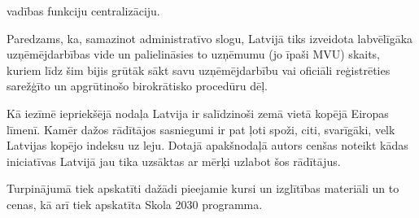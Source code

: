 vadības funkciju centralizāciju.
\par
Paredzams, ka, samazinot administratīvo slogu, Latvijā tiks izveidota labvēlīgāka
uzņēmējdarbības vide un palielināsies to uzņēmumu (jo īpaši MVU) skaits, kuriem līdz šim
bijis grūtāk sākt savu uzņēmējdarbību vai oficiāli reģistrēties sarežģīto un apgrūtinošo
birokrātisko procedūru dēļ.
\par
Kā iezīmē iepriekšējā nodaļa Latvija ir salīdzinoši zemā vietā kopējā Eiropas līmenī.
Kamēr dažos rādītājos sasniegumi ir pat ļoti spoži, citi, svarīgāki, velk Latvijas kopējo
indeksu uz leju. Dotajā apakšnodaļā autors cenšas noteikt kādas iniciatīvas Latvijā jau
tika uzsāktas ar mērķi uzlabot šos rādītājus.
\par
Turpinājumā tiek apskatīti dažādi pieejamie kursi un izglītības materiāli un to cenas,
kā arī tiek apskatīta Skola 2030 programma.